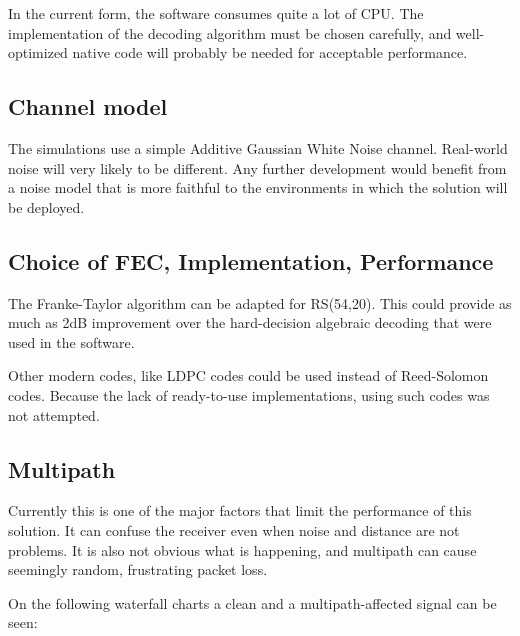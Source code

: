 \documentclass[a4paper]{article}
\begin{document}
In the current form, the software consumes quite a lot of CPU. The
implementation of the decoding algorithm must be chosen carefully, and
well-optimized native code will probably be needed for acceptable
performance.

\subsection{Channel model}

The simulations use a simple Additive Gaussian White Noise channel.
Real-world noise will very likely to be different. Any further
development would benefit from a noise model that is more faithful to
the environments in which the solution will be deployed.

\subsection{Choice of FEC, Implementation, Performance}

The Franke-Taylor algorithm\cite{ft1} can be adapted for RS(54,20).
This could provide as much as 2dB improvement over the hard-decision
algebraic decoding that were used in the software.

Other modern codes, like LDPC codes could be used instead of
Reed-Solomon codes. Because the lack of ready-to-use implementations,
using such codes was not attempted.

\subsection{Multipath}

Currently this is one of the major factors that limit the performance 
of this solution. It can confuse the receiver even when noise and
distance are not problems. It is also not obvious what is happening,
and multipath can cause seemingly random, frustrating packet loss.

On the following waterfall charts a clean and a multipath-affected
signal can be seen:
\end{document}

